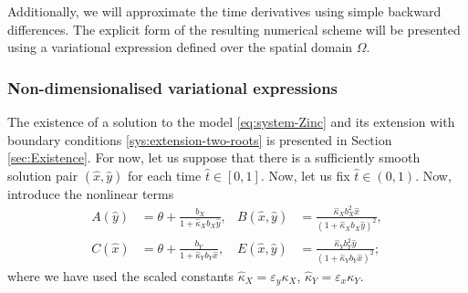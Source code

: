 \documentclass[11pt]{article}
\numberwithin{equation}{section}
\begin{document}

Additionally, we will approximate the time derivatives using simple backward differences. The explicit form of the resulting numerical scheme will be presented using a variational expression defined over the spatial domain \(\Omega\). 




\subsubsection{Non-dimensionalised variational expressions}


The existence of a solution to the model \eqref{eq:system-Zinc} and its extension with boundary conditions \eqref{sys:extension-two-roots} is presented in Section \ref{sec:Existence}. 
%
For now, let us suppose that there is a sufficiently smooth solution pair $(\hat x, \hat y)$ for each time \(\hat{t}\in [0,1]\). Now, let us fix \(\hat{t} \in (0,1)\). Now, introduce the nonlinear terms
\begin{align}
    A(\hat{y}) &= \theta + \frac{b_X}{1 + \hat{\kappa}_X b_X \hat{y}},
    &
    B(\hat{x},\hat{y}) &= \frac{\hat{\kappa}_X b_X^2 \hat{x}}{(1+\hat{\kappa}_X b_X \hat{y})^2},
    \\
    C(\hat{x}) &= \theta + \frac{b_Y}{1 + \hat{\kappa}_Y b_Y \hat{x}},
    &
    E(\hat{x},\hat{y}) &= \frac{\hat{\kappa}_Y b_Y^2 \hat{y}}{(1+\hat{\kappa}_Y b_Y \hat{x})^2};
\end{align}
where we have used the scaled constants \(\hat{\kappa}_X = \varepsilon_y \kappa_X\), \(\hat{\kappa}_Y = \varepsilon_x \kappa_Y\). 
\end{document}
